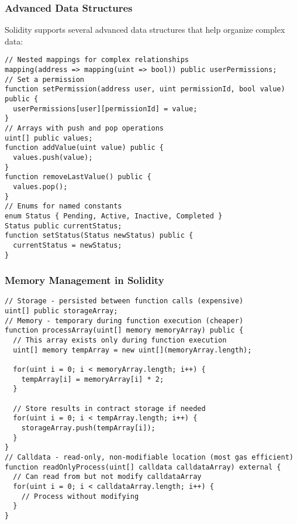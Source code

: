 \documentclass[12pt]{article}
\begin{document}
\noindent
\begin{minipage}[c]{\textwidth}
  \subsubsection*{Advanced Data Structures}

  Solidity supports several advanced data structures that help organize complex
  data:

  \begin{lstlisting}[language=Solidity]
// Nested mappings for complex relationships
mapping(address => mapping(uint => bool)) public userPermissions;
// Set a permission
function setPermission(address user, uint permissionId, bool value) public {
  userPermissions[user][permissionId] = value;
}
// Arrays with push and pop operations
uint[] public values;
function addValue(uint value) public {
  values.push(value);
}
function removeLastValue() public {
  values.pop();
}
// Enums for named constants
enum Status { Pending, Active, Inactive, Completed }
Status public currentStatus;
function setStatus(Status newStatus) public {
  currentStatus = newStatus;
}
\end{lstlisting}

  \subsubsection*{Memory Management in Solidity}

  \begin{lstlisting}[language=Solidity]
// Storage - persisted between function calls (expensive)
uint[] public storageArray;
// Memory - temporary during function execution (cheaper)
function processArray(uint[] memory memoryArray) public {
  // This array exists only during function execution
  uint[] memory tempArray = new uint[](memoryArray.length);
  
  for(uint i = 0; i < memoryArray.length; i++) {
    tempArray[i] = memoryArray[i] * 2;
  }

  // Store results in contract storage if needed
  for(uint i = 0; i < tempArray.length; i++) {
    storageArray.push(tempArray[i]);
  }
}
// Calldata - read-only, non-modifiable location (most gas efficient)
function readOnlyProcess(uint[] calldata calldataArray) external {
  // Can read from but not modify calldataArray
  for(uint i = 0; i < calldataArray.length; i++) {
    // Process without modifying
  }
}
\end{lstlisting}
\end{minipage}
\end{document}
